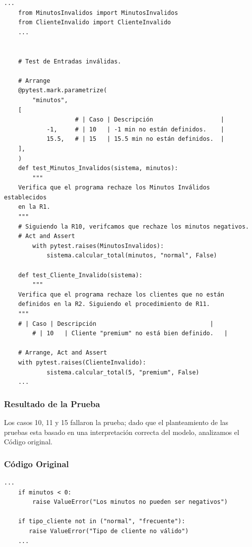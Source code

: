 \documentclass[11pt,letterpaper]{article}
\begin{document}
\vspace{\baselineskip}


\begin{lstlisting}[style=practica]
    ...    
    from MinutosInvalidos import MinutosInvalidos
    from ClienteInvalido import ClienteInvalido
    ...

    
    # Test de Entradas inválidas.

    # Arrange
    @pytest.mark.parametrize(
        "minutos",
	[
                    # | Caso | Descripción                   |
            -1,     # | 10   | -1 min no están definidos.    |
            15.5,   # | 15   | 15.5 min no están definidos.  |
	],
    )
    def test_Minutos_Invalidos(sistema, minutos):
        """
	Verifica que el programa rechaze los Minutos Inválidos establecidos
	en la R1.
	"""
	# Siguiendo la R10, verifcamos que rechaze los minutos negativos.
	# Act and Assert
        with pytest.raises(MinutosInvalidos):
            sistema.calcular_total(minutos, "normal", False)

    def test_Cliente_Invalido(sistema):
        """
	Verifica que el programa rechaze los clientes que no están
	definidos en la R2. Siguiendo el procedimiento de R11.
	"""
	# | Caso | Descripción                                |
        # | 10   | Cliente "premium" no está bien definido.   |
	
	# Arrange, Act and Assert
	with pytest.raises(ClienteInvalido):
            sistema.calcular_total(5, "premium", False)
    ...
\end{lstlisting}
\subsubsection{Resultado de la Prueba}
\label{sec:org9f1ba7c}

Los casos 10, 11 y 15 fallaron la prueba; dado que el planteamiento de las pruebas esta basado en una interpretación correcta del modelo, analizamos el Código original.
\subsubsection{Código Original}
\label{sec:orgcf9c649}


\begin{lstlisting}[style=practica]
    ...
    if minutos < 0:
        raise ValueError("Los minutos no pueden ser negativos")

    if tipo_cliente not in ("normal", "frecuente"):
       raise ValueError("Tipo de cliente no válido")
    ...
\end{lstlisting}
\end{document}
